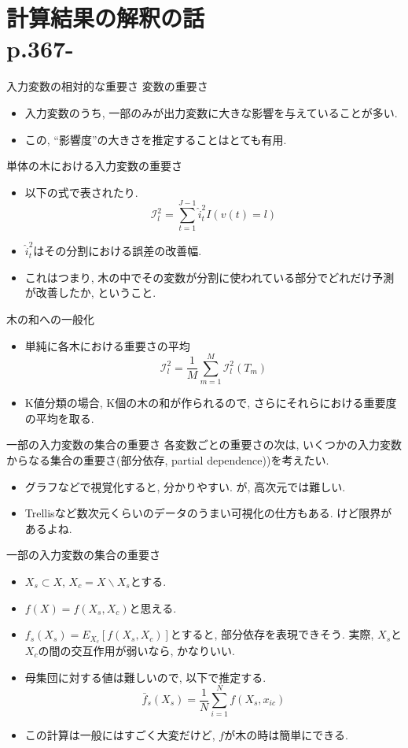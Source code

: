 \documentclass[dvipdfmx,8pt]{beamer}
\begin{document}
  \section{計算結果の解釈の話\\p.367-}
  \begin{frame}{入力変数の相対的な重要さ}
    変数の重要さ
    \begin{itemize}
      \item 入力変数のうち, 一部のみが出力変数に大きな影響を与えていることが多い.
      \item この, ``影響度''の大きさを推定することはとても有用.
    \end{itemize}
    単体の木における入力変数の重要さ
    \begin{itemize}
      \item 以下の式で表されたり.
      \[
        \mathcal{I}_l^2=\sum_{t=1}^{J-1}\hat{i}_t^2I(v(t)=l)
      \]
      \item $\hat{i}_t^2$はその分割における誤差の改善幅.
      \item これはつまり, 木の中でその変数が分割に使われている部分でどれだけ予測が改善したか, ということ.
    \end{itemize}
    木の和への一般化
    \begin{itemize}
      \item 単純に各木における重要さの平均
      \[
        \mathcal{I}_l^2=\frac{1}{M}\sum_{m=1}^M\mathcal{I}_l^2(T_m)
      \]
      \item K値分類の場合, K個の木の和が作られるので, さらにそれらにおける重要度の平均を取る.
    \end{itemize}
  \end{frame}
  \begin{frame}{一部の入力変数の集合の重要さ}
    各変数ごとの重要さの次は, いくつかの入力変数からなる集合の重要さ(部分依存, partial dependence))を考えたい.
    \begin{itemize}
      \item グラフなどで視覚化すると, 分かりやすい. が, 高次元では難しい.
      \item Trellisなど数次元くらいのデータのうまい可視化の仕方もある. けど限界があるよね.
    \end{itemize}
    一部の入力変数の集合の重要さ
    \begin{itemize}
      \item $X_s \subset X$, $X_c=X\backslash X_s$とする.
      \item $f(X)=f(X_s,X_c)$と思える.
      \item $f_s(X_s)=E_{X_c}[f(X_s,X_c)]$とすると, 部分依存を表現できそう.
      実際, $X_s$と$X_c$の間の交互作用が弱いなら, かなりいい.
      \item 母集団に対する値は難しいので, 以下で推定する.
      \[
        \bar{f}_s(X_s)=\frac{1}{N}\sum_{i=1}^Nf(X_s,x_{ic})
      \]
      \item この計算は一般にはすごく大変だけど, $f$が木の時は簡単にできる.
    \end{itemize}
  \end{frame}
\end{document}
